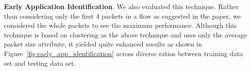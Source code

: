 \documentclass[conference]{IEEEtran}
\begin{document}
\textbf{Early Application Identification}.\cite{Bernaille:2006:EAI:1368436.1368445}
We also evaluated this technique. Rather than considering only the first 4 packets in a flow as suggested in the paper, we considered the whole packets to see the maximum performance.
Although this technique is based on clustering as the above technique and uses only the average packet size attribute, it yielded quite enhanced results as shown in Figure~\ref{fig:early_app_identification} across diverse ratios between training data set and testing data set.

%
\end{document}
